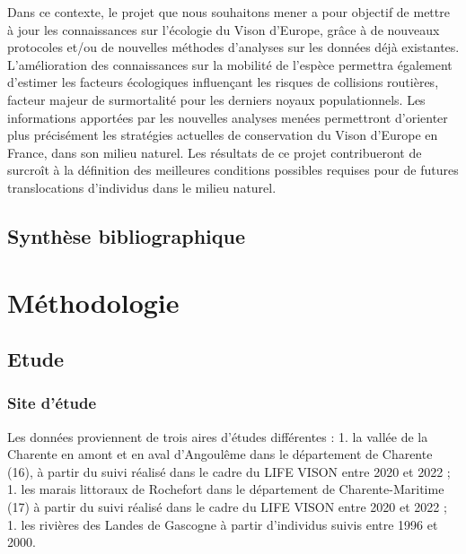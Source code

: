 \documentclass[
  letterpaper,
  DIV=11,
  numbers=noendperiod]{scrreprt}
\begin{document}
Dans ce contexte, le projet que nous souhaitons mener a pour objectif de
mettre à jour les connaissances sur l'écologie du Vison d'Europe, grâce
à de nouveaux protocoles et/ou de nouvelles méthodes d'analyses sur les
données déjà existantes. L'amélioration des connaissances sur la
mobilité de l'espèce permettra également d'estimer les facteurs
écologiques influençant les risques de collisions routières, facteur
majeur de surmortalité pour les derniers noyaux populationnels. Les
informations apportées par les nouvelles analyses menées permettront
d'orienter plus précisément les stratégies actuelles de conservation du
Vison d'Europe en France, dans son milieu naturel. Les résultats de ce
projet contribueront de surcroît à la définition des meilleures
conditions possibles requises pour de futures translocations d'individus
dans le milieu naturel.

\chapter{Synthèse bibliographique}\label{synthuxe8se-bibliographique}

\part{Méthodologie}

\chapter{Etude}\label{etude}

\section{Site d'étude}\label{site-duxe9tude}

Les données proviennent de trois aires d'études différentes : 1. la
vallée de la Charente en amont et en aval d'Angoulême dans le
département de Charente (16), à partir du suivi réalisé dans le cadre du
LIFE VISON entre 2020 et 2022 ; 1. les marais littoraux de Rochefort
dans le département de Charente-Maritime (17) à partir du suivi réalisé
dans le cadre du LIFE VISON entre 2020 et 2022 ; 1. les rivières des
Landes de Gascogne à partir d'individus suivis entre 1996 et 2000.
\end{document}
